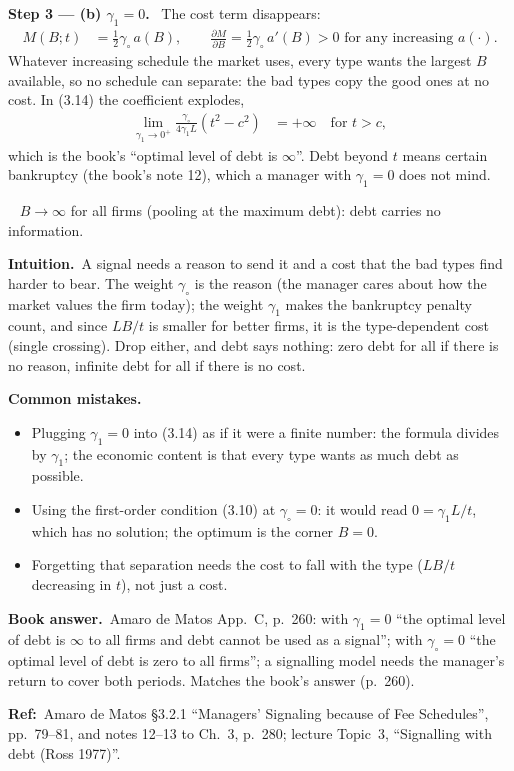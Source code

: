 \documentclass[11pt,a4paper]{article}
\newcommand{\step}[2]{\par\medskip\noindent\textbf{Step #1 --- #2.}~}
\newcommand{\intuition}{\par\medskip\noindent\textbf{Intuition.}~}
\newcommand{\bookans}{\par\medskip\noindent\textbf{Book answer.}~}
\newcommand{\refbib}{\par\smallskip\noindent\textbf{Ref:}~}
\newcommand{\answer}[1]{\par\smallskip\noindent\fbox{\textbf{Answer #1.}}~}
\newcommand{\pitfalls}{\par\medskip\noindent\textbf{Common mistakes.}}
\begin{document}
\step{3}{(b) $\gamma_1=0$} The cost term disappears:
\begin{align}
  M(B;t) &= \frac12\gamma_\circ\,a(B), \qquad \frac{\partial M}{\partial B} = \frac12\gamma_\circ\,a'(B) > 0 \text{ for any increasing } a(\cdot). \nonumber
\end{align}
Whatever increasing schedule the market uses, every type wants the largest $B$ available, so no schedule can separate: the bad types copy the good ones at no cost. In (3.14) the coefficient explodes,
\begin{align}
  \lim_{\gamma_1\to 0^+}\frac{\gamma_\circ}{4\gamma_1 L}(t^2-c^2) &= +\infty \quad\text{for } t>c, \nonumber
\end{align}
which is the book's ``optimal level of debt is $\infty$''. Debt beyond $t$ means certain bankruptcy (the book's note 12), which a manager with $\gamma_1=0$ does not mind.
\answer{(b)} $B\to\infty$ for all firms (pooling at the maximum debt): debt carries no information.

\intuition A signal needs a reason to send it and a cost that the bad types find harder to bear. The weight $\gamma_\circ$ is the reason (the manager cares about how the market values the firm today); the weight $\gamma_1$ makes the bankruptcy penalty count, and since $LB/t$ is smaller for better firms, it is the type-dependent cost (single crossing). Drop either, and debt says nothing: zero debt for all if there is no reason, infinite debt for all if there is no cost.

\pitfalls
\begin{itemize}
  \item Plugging $\gamma_1=0$ into (3.14) as if it were a finite number: the formula divides by $\gamma_1$; the economic content is that every type wants as much debt as possible.
  \item Using the first-order condition (3.10) at $\gamma_\circ=0$: it would read $0=\gamma_1L/t$, which has no solution; the optimum is the corner $B=0$.
  \item Forgetting that separation needs the cost to fall with the type ($LB/t$ decreasing in $t$), not just a cost.
\end{itemize}

\bookans Amaro de Matos App.~C, p.~260: with $\gamma_1=0$ ``the optimal level of debt is $\infty$ to all firms and debt cannot be used as a signal''; with $\gamma_\circ=0$ ``the optimal level of debt is zero to all firms''; a signalling model needs the manager's return to cover both periods. Matches the book's answer (p.~260).
\refbib{Amaro de Matos \S3.2.1 ``Managers' Signaling because of Fee Schedules'', pp.~79--81, and notes 12--13 to Ch.~3, p.~280; lecture Topic~3, ``Signalling with debt (Ross 1977)''.}
\end{document}
